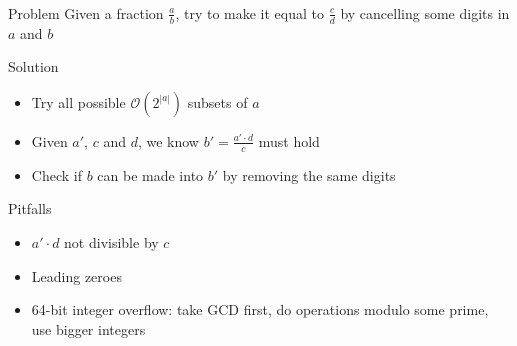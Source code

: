 \begin{frame}
    \frametitle{\problemtitle}
    \begin{block}{Problem}
        Given a fraction $\frac{a}{b}$,
        try to make it equal to $\frac{c}{d}$ by
        cancelling some digits in $a$ and $b$
    \end{block}
    \pause
    \begin{block}{Solution}
      \begin{itemize}
      \item Try all possible $\mathcal O(2^{\left|a\right|})$ subsets of $a$
      \item Given $a'$, $c$ and $d$, we know $b' = \frac{a' \cdot d}{c}$ must hold
      \item Check if $b$ can be made into $b'$ by removing the same digits
      \end{itemize}
    \end{block}
    \pause
    \begin{block}{Pitfalls}
      \begin{itemize}
      \item $a' \cdot d$ not divisible by $c$
      \item Leading zeroes
      \item 64-bit integer overflow: take GCD first, do operations modulo some prime, use bigger integers
      \end{itemize}
    \end{block}
    \pause
    \solvestats
\end{frame}
